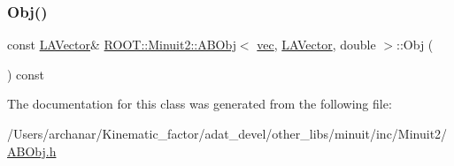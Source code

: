 \mbox{\label{classROOT_1_1Minuit2_1_1ABObj_3_01vec_00_01LAVector_00_01double_01_4_a8c53d63141dbfd9b90f73290b895d87a}} 
\subsubsection{\texorpdfstring{Obj()}{Obj()}\hspace{0.1cm}{\footnotesize\ttfamily [2/2]}}
{\footnotesize\ttfamily const \mbox{\hyperlink{classROOT_1_1Minuit2_1_1LAVector}{L\+A\+Vector}}\& \mbox{\hyperlink{classROOT_1_1Minuit2_1_1ABObj}{R\+O\+O\+T\+::\+Minuit2\+::\+A\+B\+Obj}}$<$ \mbox{\hyperlink{classROOT_1_1Minuit2_1_1vec}{vec}}, \mbox{\hyperlink{classROOT_1_1Minuit2_1_1LAVector}{L\+A\+Vector}}, double $>$\+::Obj (\begin{DoxyParamCaption}{ }\end{DoxyParamCaption}) const\hspace{0.3cm}{\ttfamily [inline]}}



The documentation for this class was generated from the following file\+:\begin{DoxyCompactItemize}
\item 
/\+Users/archanar/\+Kinematic\+\_\+factor/adat\+\_\+devel/other\+\_\+libs/minuit/inc/\+Minuit2/\mbox{\hyperlink{other__libs_2minuit_2inc_2Minuit2_2ABObj_8h}{A\+B\+Obj.\+h}}\end{DoxyCompactItemize}
